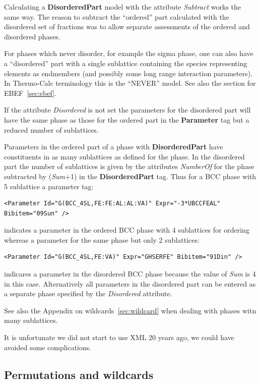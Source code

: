 \documentclass{article}
\begin{document}
Calculating a {\bf DisorderedPart} model with the attribute {\em
  Subtract} works the same way.  The reason to subtract the
``ordered'' part calculated with the disordered set of fractions was
to allow separate assessments of the ordered and disordered phases.

For phases which never disorder, for example the sigma phase, one can
also have a ``disordered'' part with a single sublattice containing
the species representing elements as endmembers (and possibly some
long range interaction parameters).  In Thermo-Calc terminology this
is the ``NEVER'' model.  See also the section for EBEF~\ref{sec:ebef}.

If the attribute {\em Disordered} is not set the parameters for the
disordered part will have the same phase as those for the ordered part
in the {\bf Parameter} tag but a reduced number of sublattices.

Parameters in the ordered part of a phase with {\bf DisorderedPart}
have constituents in as many sublattices as defined for the phase.  In
the disordered part the number of sublattices is given by the
attributes {\em NumberOf} for the phase subtracted by ({\em Sum}+1) in
the {\bf DisorderedPart} tag.  Thus for a BCC phase with 5 sublattice
a parameter tag:
\begin{verbatim}
<Parameter Id="G(BCC_4SL,FE:FE:AL:AL:VA)" Expr="-3*UBCCFEAL" Bibitem="09Sun" />
\end{verbatim}
indicates a parameter in the ordered BCC phase with 4 sublattices for
ordering whereas a parameter for the same phase but only 2 sublattices:
\begin{verbatim}
<Parameter Id="G(BCC_4SL,FE:VA)" Expr="GHSERFE" Bibitem="91Din" />
\end{verbatim}
indicares a parameter in the disordered BCC phase because the value of
{\em Sum} is 4 in this case.  Alternatively all parameters in the
disordered part can be entered as a separate phase specified by the
{\em Disordered} attribute.

See also the Appendix on wildcards~\ref{sec:wildcard} when dealing
with phases witn many sublattices.

It is unfortunate we did not start to use XML 20 years ago, we could
have avoided some complications.

\subsection{Permutations and wildcards}
\end{document}
